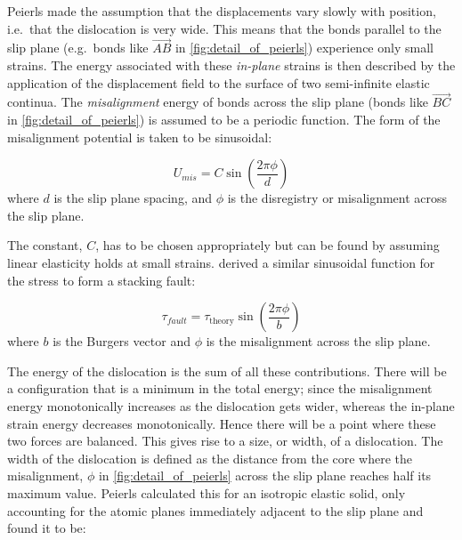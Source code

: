 Peierls made the assumption that the displacements vary slowly with position, i.e.\ that the dislocation is very wide. This means that the bonds parallel to the slip plane (e.g.\ bonds like $\overrightarrow{AB}$ in \autoref{fig:detail_of_peierls}) experience only small strains. The energy associated with these \emph{in-plane} strains is then described  by the application of the displacement field to the surface of two semi-infinite elastic continua. 
The \emph{misalignment} energy of bonds across the slip plane (bonds like $\overrightarrow{BC}$ in \autoref{fig:detail_of_peierls}) is assumed to be a periodic function. The form of the misalignment potential is taken to be sinusoidal:

\begin{equation}
U_{mis} = C \sin \left(\frac{2\pi \phi}{d} \right) \label{eqn:Frenkel_approx}
\end{equation}
where $d$ is the slip plane spacing, and $\phi$ is the disregistry or misalignment across the slip plane.














%
%
%
%
%
%
%
%
%
%





The constant, $C$, has to be chosen appropriately but can be found by assuming linear elasticity holds at small strains. \citet{Frenkel1926} derived a similar sinusoidal function for the stress to form a stacking fault:










\begin{equation}
\tau_{fault} = \tau_{\text{theory}} \sin \left( \frac{2\pi \phi}{b} \right)
\end{equation}
where $b$ is the Burgers vector and $\phi$ is the misalignment across the slip plane.

The energy of the dislocation is the sum of all these contributions. There will be a configuration that is a minimum in the total energy; since the misalignment energy monotonically increases as the dislocation gets wider, whereas the in-plane strain energy decreases monotonically. Hence there will be a point where these two forces are balanced. This gives rise to a size, or width, of a dislocation. The width of the dislocation is defined as the distance from the core where the misalignment, $\phi$ in \autoref{fig:detail_of_peierls} across the slip plane reaches half its maximum value. Peierls calculated this for an isotropic elastic solid, only accounting for the atomic planes immediately adjacent to the slip plane and found it to be:

